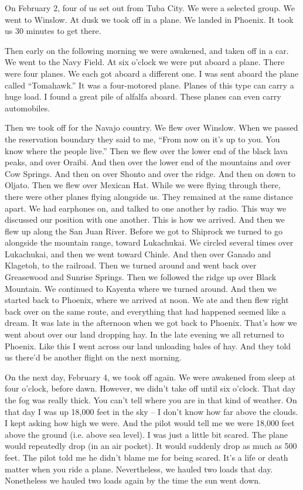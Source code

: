On February 2, four of us set out from Tuba City. We were a selected group. We went to Winslow. At dusk we took off in a plane. We landed in Phoenix. It took us 30 minutes to get there.

Then early on the following morning we were awakened, and taken off in a car. We went to the Navy Field. At six o'clock we were put aboard a plane. There were four planes. We each got aboard a different one. I was sent aboard the plane called ``Tomahawk.'' It was a four-motored plane. Planes of this type can carry a huge load. I found a great pile of alfalfa aboard. These planes can even carry automobiles.

Then we took off for the Navajo country. We flew over Winslow. When we passed the reservation boundary they said to me, ``From now on it's up to you. You know where the people live.'' Then we flew over the lower end of the black lava peaks, and over Oraibi. And then over the lower end of the mountains and over Cow Springs. And then on over Shonto and over the ridge. And then on down to Oljato. Then we flew over Mexican Hat. While we were flying through there, there were other planes flying alongside us. They remained at the same distance apart. We had earphones on, and talked to one another by radio. This way we discussed our position with one another. This is how we arrived. And then we flew up along the San Juan River. Before we got to Shiprock we turned to go alongside the mountain range, toward Lukachukai. We circled several times over Lukachukai, and then we went toward Chinle. And then over Ganado and Klagetoh, to the railroad. Then we turned around and went back over Greasewood and Sunrise Springs. Then we followed the ridge up over Black Mountain. We continued to Kayenta where we turned around. And then we started back to Phoenix, where we arrived at noon. We ate and then flew right back over on the same route, and everything that had happened seemed like a dream. It was late in the afternoon when we got back to Phoenix. That's how we went about over our land dropping hay. In the late evening we all returned to Phoenix. Like this I went across our land unloading bales of hay. And they told us there'd be another flight on the next morning.

On the next day, February 4, we took off again. We were awakened from sleep at four o'clock, before dawn. However, we didn't take off until six o'clock. That day the fog was really thick. You can't tell where you are in that kind of weather. On that day I was up 18,000 feet in the sky -- I don't know how far above the clouds. I kept asking how high we were. And the pilot would tell me we were 18,000 feet above the ground (i.e. above sea level). I was just a little bit scared. The plane would repeatedly drop (in an air pocket). It would suddenly drop as much as 500 feet. The pilot told me he didn't blame me for being scared. It's a life or death matter when you ride a plane. Nevertheless, we hauled two loads that day. Nonetheless we hauled two loads again by the time the sun went down.

